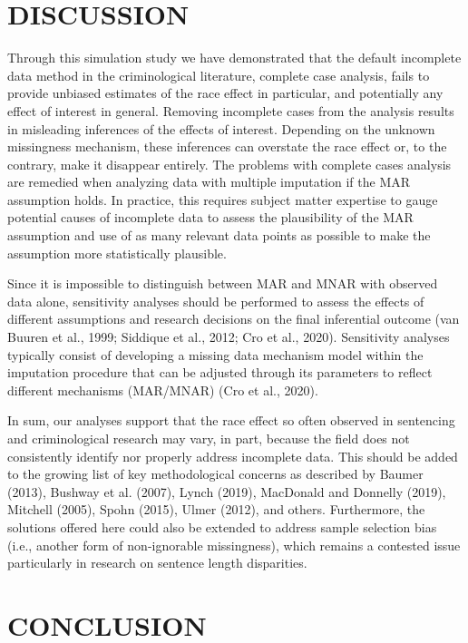 \documentclass[titlepage]{article}
\begin{document}
\section{DISCUSSION}

Through this simulation study we have demonstrated that the default incomplete data method in the criminological literature, complete case analysis, fails to provide unbiased estimates of the race effect in particular, and potentially any effect of interest in general. Removing incomplete cases from the analysis results in misleading inferences of the effects of interest. Depending on the unknown missingness mechanism, these inferences can overstate the race effect or, to the contrary, make it disappear entirely. The problems with complete cases analysis are remedied when analyzing data with multiple imputation if the MAR assumption holds. In practice, this requires subject matter expertise to gauge potential causes of incomplete data to assess the plausibility of the MAR assumption and use of as many relevant data points as possible to make the assumption more statistically plausible. 

Since it is impossible to distinguish between MAR and MNAR with observed data alone, sensitivity analyses should be performed to assess the effects of different assumptions and research decisions on the final inferential outcome (van Buuren et al., 1999; Siddique et al., 2012; Cro et al., 2020). Sensitivity analyses typically consist of developing a missing data mechanism model within the imputation procedure that can be adjusted through its parameters to reflect different mechanisms (MAR/MNAR) (Cro et al., 2020).

In sum, our analyses support that the race effect so often observed in sentencing and criminological research may vary, in part, because the field does not consistently identify nor properly address incomplete data. This should be added to the growing list of key methodological concerns as described by Baumer (2013), Bushway et al. (2007), Lynch (2019), MacDonald and Donnelly (2019), Mitchell (2005), Spohn (2015), Ulmer (2012), and others. Furthermore, the solutions offered here could also be extended to address sample selection bias (i.e., another form of non-ignorable missingness), which remains a contested issue particularly in research on sentence length disparities.  

\section{CONCLUSION}
\end{document}
